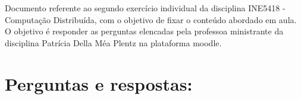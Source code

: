\documentclass[
    article,            %
    11pt,               %
    oneside,            %
    a4paper,            %
    english,            %
    brazil,             %
    sumario=tradicional,
    ]{abntex2}
\begin{document}

\frenchspacing 


%
%

\maketitle


\begin{resumoumacoluna}
    Documento referente ao segundo exercício individual da disciplina INE5418 - Computação Distribuída, com o objetivo de fixar o conteúdo abordado em aula. O objetivo é responder as perguntas elencadas pela professoa ministrante da disciplina Patrícia Della Méa Plentz na plataforma moodle.
 
 \vspace{\onelineskip}
 
\end{resumoumacoluna}


\textual



\section*{\textbf{Perguntas e respostas:}}


\end{document}
